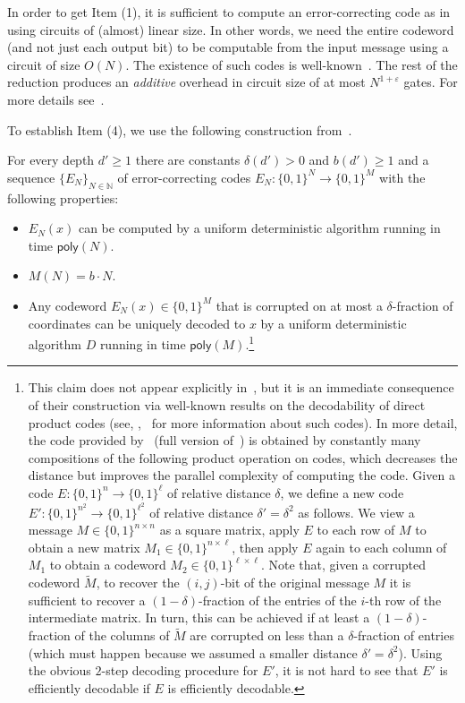 \documentclass{toc}
\begin{document}
In order to get Item (1), it is sufficient to compute an error-correcting code as in  using circuits of (almost) linear size. In other words, we need the entire codeword (and not just each output bit) to be computable from the input message using a circuit of size $O(N)$. The existence of such codes is well-known~\cite{DBLP:journals/tit/SipserS96, DBLP:journals/tit/Spielman96}. The rest of the reduction produces an \emph{additive} overhead in circuit size of at most $N^{1 + \varepsilon}$ gates. For more details see~\cite{OS18}.

To establish Item (4), we use the following construction from~\cite{RoeiTell18}.

\begin{theorem} \label{thm:code2} For every depth $d' \geq 1$ there are constants $\delta(d') > 0$ and $b(d') \geq 1$ and a sequence $\{E_N\}_{N \in \mathbb{N}}$ of error-correcting codes $E_N \colon \{0,1\}^N \to \{0,1\}^{M}$ with the following properties:
\vspace{0.2cm}
\begin{itemize}
\item $E_N(x)$ can be computed by a uniform deterministic algorithm running in time $\mathsf{poly}(N)$.
\item $M(N) = b \cdot N$.
\item Any codeword $E_N(x) \in \{0,1\}^{M}$ that is corrupted on at most a $\delta$-fraction of coordinates can be uniquely decoded to $x$ by a uniform deterministic algorithm $D$ running in time $\mathsf{poly}(M)$.\footnote{This claim does not appear explicitly in~\cite{RoeiTell18}, but it is an immediate consequence of their construction via well-known results on the decodability of direct product codes (see, \eg,~\cite{macwilliams1977theory} for more information about such codes). In more detail, the code provided by~\cite[Proposition 6.5]{DBLP:journals/eccc/Tell17} (full version of~\cite{RoeiTell18}) is obtained by constantly many compositions of the following product operation on codes, which decreases the distance but improves the parallel complexity of computing the code. Given a code $E \colon \{0,1\}^{n} \to \{0,1\}^{\ell}$ of relative distance $\delta$, we define a new code $E' \colon \{0,1\}^{n^2} \to \{0,1\}^{\ell^2}$ of relative distance $\delta' = \delta^2$ as follows. We view a message $M \in \{0,1\}^{n \times n}$ as a square matrix, apply $E$ to each row of $M$ to obtain a new matrix $M_1 \in \{0,1\}^{n \times \ell}$, then apply $E$ again to each column of $M_1$ to obtain a codeword $M_2 \in \{0,1\}^{\ell \times \ell}$. Note that, given a corrupted codeword $\widetilde{M}$, to recover the $(i,j)$-bit of the original message $M$ it is sufficient to recover a $(1 - \delta)$-fraction of the entries of the $i$-th row of the intermediate matrix. In turn, this can be achieved if at least a $(1 - \delta)$-fraction of the columns of $\widetilde{M}$ are corrupted on less than a $\delta$-fraction of entries (which must happen because we assumed a smaller distance $\delta' = \delta^2$). Using the obvious $2$-step decoding procedure for $E'$, it is not hard to see that $E'$ is efficiently decodable if $E$ is efficiently decodable.}

\end{itemize}
\end{theorem}
\end{document}
